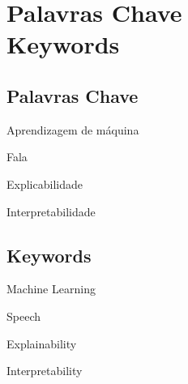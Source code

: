 \newpage


\chapter*{Palavras Chave \\ Keywords}
\thispagestyle{empty}

\section*{Palavras Chave}
{\large %

\noindent Aprendizagem de máquina

\noindent Fala

\noindent Explicabilidade

\noindent Interpretabilidade

}

\section*{Keywords}

{\large %

\noindent Machine Learning

\noindent Speech

\noindent Explainability

\noindent Interpretability

}

\vfill

\cleardoublepage



\pagestyle{plain}



\def\contentsname{Table of Contents}
\tableofcontents
\newpage

\listoffigures
\newpage

\listoftables

\cleardoublepage


